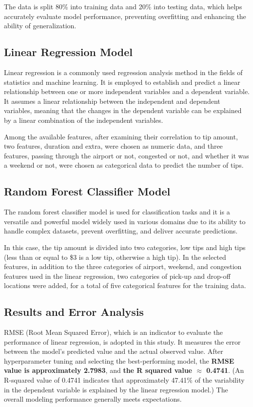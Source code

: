 \documentclass[11pt]{article}
\begin{document}
The data is split 80\% into training data and 20\% into testing data, which helps accurately evaluate model performance, preventing overfitting and enhancing the ability of generalization.

\subsection{Linear Regression Model}
Linear regression is a commonly used regression analysis method in the fields of statistics and machine learning. It is employed to establish and predict a linear relationship between one or more independent variables and a dependent variable. It assumes a linear relationship between the independent and dependent variables, meaning that the changes in the dependent variable can be explained by a linear combination of the independent variables.\cite{lr}

Among the available features, after examining their correlation to tip amount, two features, duration and extra, were chosen as numeric data, and three features, passing through the airport or not, congested or not, and whether it was a weekend or not, were chosen as categorical data to predict the number of tips.

\subsection{Random Forest Classifier Model}
The random forest classifier model is used for classification tasks and it is a versatile and powerful model widely used in various domains due to its ability to handle complex datasets, prevent overfitting, and deliver accurate predictions.\cite{rf}

In this case, the tip amount is divided into two categories, low tips and high tips (less than or equal to \$3 is a low tip, otherwise a high tip). In the selected features, in addition to the three categories of airport, weekend, and congestion features used in the linear regression, two categories of pick-up and drop-off locations were added, for a total of five categorical features for the training data.

\subsection{Results and Error Analysis}
RMSE (Root Mean Squared Error), which is an indicator to evaluate the performance of linear regression, is adopted in this study. It measures the error between the model's predicted value and the actual observed value. After hyperparameter tuning and selecting the best-performing model, the \textbf{RMSE value is approximately 2.7983}, and \textbf{the R squared value $\approx$ 0.4741}. (An R-squared value of 0.4741 indicates that approximately 47.41\% of the variability in the dependent variable is explained by the linear regression model.) The overall modeling performance generally meets expectations.
\end{document}
